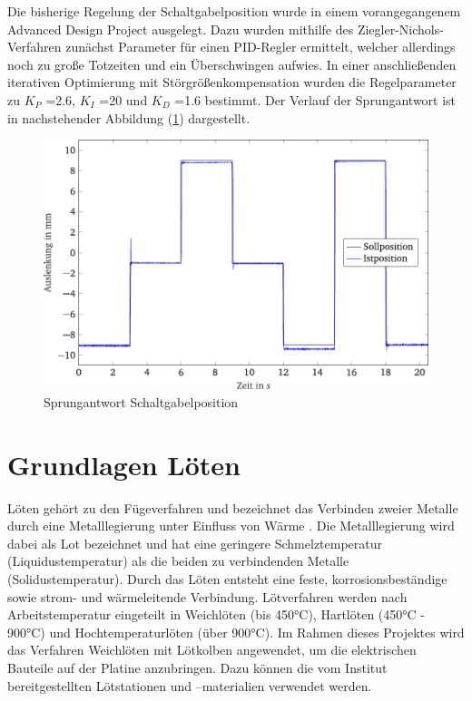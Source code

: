 Die bisherige Regelung der Schaltgabelposition wurde in einem vorangegangenem Advanced Design Project ausgelegt. Dazu wurden mithilfe des Ziegler-Nichols-Verfahren zunächst Parameter für einen PID-Regler ermittelt, welcher allerdings noch zu große Totzeiten und ein Überschwingen aufwies. In einer anschließenden iterativen Optimierung mit Störgrößenkompensation wurden die Regelparameter zu $K_P$ =\SI{2,6}{}, $K_I$ =\SI{20}{} und $K_D$ =\SI{1,6}{} bestimmt. Der Verlauf der Sprungantwort ist in nachstehender Abbildung (\ref{fig:Sprungantwort Schaltgabelposition}) dargestellt.
\begin{figure}[h]
	\centering
		\includegraphics{Bilder/SprungantwortSchaltgabelposition.pdf}
	\caption{Sprungantwort Schaltgabelposition \cite[S.35]{adp}}
	\label{fig:Sprungantwort Schaltgabelposition}
\end{figure} \noindent

\section{Grundlagen Löten}
Löten gehört zu den Fügeverfahren und bezeichnet das Verbinden zweier Metalle durch eine Metalllegierung unter Einfluss von Wärme \cite{loeten}. Die Metalllegierung wird dabei als Lot bezeichnet und hat eine geringere Schmelztemperatur (Liquidustemperatur) als die beiden zu verbindenden Metalle (Solidustemperatur). Durch das Löten entsteht eine feste, korrosionsbeständige sowie strom- und wärmeleitende Verbindung. Lötverfahren werden nach Arbeitstemperatur eingeteilt in Weichlöten (bis 450°C), Hartlöten (450°C - 900°C) und Hochtemperaturlöten (über 900°C). Im Rahmen dieses Projektes wird das Verfahren Weichlöten mit Lötkolben angewendet, um die elektrischen Bauteile auf der Platine anzubringen. Dazu können die vom Institut bereitgestellten Lötstationen und –materialien verwendet werden. 

